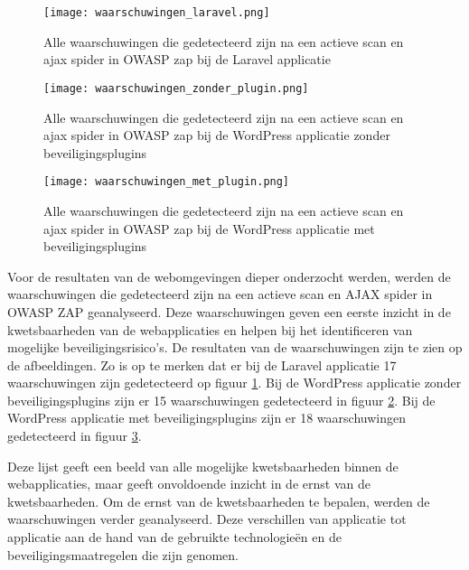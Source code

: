 \begin{figure}
    \centering
    \texttt{[image: waarschuwingen\_laravel.png]}
    \caption[Alle waarschuwingen die gedetecteerd zijn na een actieve scan en ajax spider in OWASP zap bij de Laravel applicatie]
    {Alle waarschuwingen die gedetecteerd zijn na een actieve scan en ajax spider in OWASP zap bij de Laravel applicatie}
    \label{fig:waarschuwingen_laravel}
\end{figure}
\begin{figure}
    \centering
    \texttt{[image: waarschuwingen\_zonder\_plugin.png]}
    \caption[Alle waarschuwingen die gedetecteerd zijn na een actieve scan en ajax spider in OWASP zap bij de WordPress applicatie zonder beveiligingsplugins]
    {Alle waarschuwingen die gedetecteerd zijn na een actieve scan en ajax spider in OWASP zap bij de WordPress applicatie zonder beveiligingsplugins}
    \label{fig:waarschuwingen_zonder}
\end{figure}
\begin{figure}
    \centering
    \texttt{[image: waarschuwingen\_met\_plugin.png]}
    \caption[Alle waarschuwingen die gedetecteerd zijn na een actieve scan en ajax spider in OWASP zap bij de WordPress applicatie met beveiligingsplugins]
    {Alle waarschuwingen die gedetecteerd zijn na een actieve scan en ajax spider in OWASP zap bij de WordPress applicatie met beveiligingsplugins}
    \label{fig:waarschuwingen_met}
\end{figure}

Voor de resultaten van de webomgevingen dieper onderzocht werden, werden de waarschuwingen die gedetecteerd zijn na een actieve scan en AJAX spider in OWASP ZAP 
geanalyseerd. Deze waarschuwingen geven een eerste inzicht in de kwetsbaarheden van de webapplicaties en helpen bij het identificeren van 
mogelijke beveiligingsrisico's. De resultaten van de waarschuwingen zijn te zien op de afbeeldingen. Zo is op te merken dat er bij de 
Laravel applicatie 17 waarschuwingen zijn gedetecteerd op figuur \ref{fig:waarschuwingen_laravel}. Bij de WordPress applicatie zonder 
beveiligingsplugins zijn er 15 waarschuwingen gedetecteerd in figuur \ref{fig:waarschuwingen_zonder}. Bij de WordPress 
applicatie met beveiligingsplugins zijn er 18 waarschuwingen gedetecteerd in figuur \ref{fig:waarschuwingen_met}.

Deze lijst geeft een beeld van alle mogelijke kwetsbaarheden binnen de webapplicaties, maar geeft onvoldoende inzicht in de 
ernst van de kwetsbaarheden. Om de ernst van de kwetsbaarheden te bepalen, werden de waarschuwingen verder geanalyseerd. 
Deze verschillen van applicatie tot applicatie aan de hand van de gebruikte technologieën en de 
beveiligingsmaatregelen die zijn genomen.

